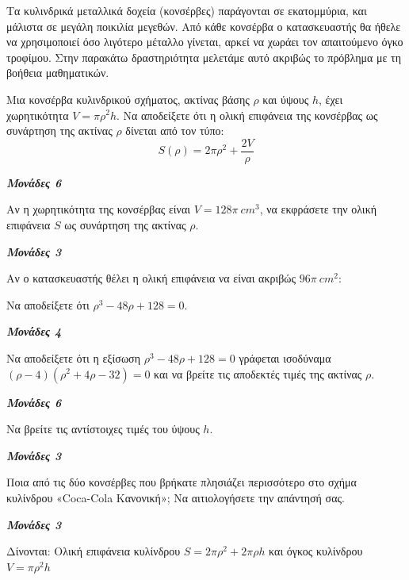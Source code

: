 \documentclass[11pt,a4paper,twoside]{book}
\newcommand{\monades}[1]{
\hspace*{\fill}
\textbf{\textit{\textcolor{maincolor}{Μονάδες #1}}}}
\begin{document}
Τα κυλινδρικά μεταλλικά δοχεία (κονσέρβες) παράγονται σε εκατομμύρια, και μάλιστα σε μεγάλη ποικιλία μεγεθών. Από κάθε κονσέρβα ο κατασκευαστής θα ήθελε να χρησιμοποιεί όσο λιγότερο μέταλλο γίνεται, αρκεί να χωράει τον απαιτούμενο όγκο τροφίμου. Στην παρακάτω δραστηριότητα μελετάμε αυτό ακριβώς το πρόβλημα με τη βοήθεια μαθηματικών.
\begin{marginfigure}[0cm]

\end{marginfigure}

\begin{alist}
\item Μια κονσέρβα κυλινδρικού σχήματος, ακτίνας βάσης $\rho$ και ύψους $h$, έχει χωρητικότητα $V = \pi\rho^2 h$. Να αποδείξετε ότι η ολική επιφάνεια της κονσέρβας ως συνάρτηση της ακτίνας $\rho$ δίνεται από τον τύπο:
\begin{equation*}S(\rho) = 2\pi\rho^2 + \dfrac{2V}{\rho}\end{equation*}
\monades{6}
\item Αν η χωρητικότητα της κονσέρβας είναι $V = 128\pi\ cm^3$, να εκφράσετε την ολική επιφάνεια $S$ ως συνάρτηση της ακτίνας $\rho$.
\monades{3}
\item Αν ο κατασκευαστής θέλει η ολική επιφάνεια να είναι ακριβώς $96\pi\ cm^2$:
\begin{rlist}
\item Να αποδείξετε ότι $\rho^3 - 48\rho + 128 = 0$.
\monades{4}
\item Να αποδείξετε ότι η εξίσωση $\rho^3 - 48\rho + 128 = 0$ γράφεται ισοδύναμα $(\rho - 4)(\rho^2 + 4\rho - 32) = 0$ και να βρείτε τις αποδεκτές τιμές της ακτίνας $\rho$.
\monades{6}
\item Να βρείτε τις αντίστοιχες τιμές του ύψους $h$.
\monades{3}
\end{rlist}
\item Ποια από τις δύο κονσέρβες που βρήκατε πλησιάζει περισσότερο στο σχήμα κυλίνδρου «Coca-Cola Κανονική»; Να αιτιολογήσετε την απάντησή σας.
\monades{3}

Δίνονται: Ολική επιφάνεια κυλίνδρου $S = 2\pi\rho^{2} + 2\pi\rho h$ και όγκος κυλίνδρου $V = \pi\rho^{2}h$
\end{alist}
\end{document}
